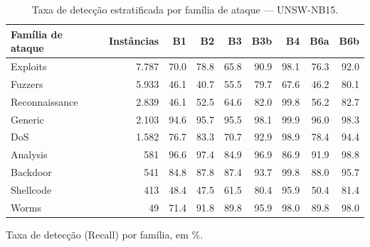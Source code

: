 \begin{table}[htbp]
\centering
\caption{Taxa de detecção estratificada por família de ataque — UNSW-NB15.}
\label{tab:recall-estratificado-unsw-nb15}
\small
\begin{tabular}{lrrrrrrrr}
\hline
Família de ataque & Instâncias & B1 & B2 & B3 & B3b & B4 & B6a & B6b \\
\hline
Exploits & 7.787 & 70.0 & 78.8 & 65.8 & 90.9 & 98.1 & 76.3 & 92.0 \\
Fuzzers & 5.933 & 46.1 & 40.7 & 55.5 & 79.7 & 67.6 & 46.2 & 80.1 \\
Reconnaissance & 2.839 & 46.1 & 52.5 & 64.6 & 82.0 & 99.8 & 56.2 & 82.7 \\
Generic & 2.103 & 94.6 & 95.7 & 95.5 & 98.1 & 99.9 & 96.0 & 98.3 \\
DoS & 1.582 & 76.7 & 83.3 & 70.7 & 92.9 & 98.9 & 78.4 & 94.4 \\
Analysis & 581 & 96.6 & 97.4 & 84.9 & 96.9 & 86.9 & 91.9 & 98.8 \\
Backdoor & 541 & 84.8 & 87.8 & 87.4 & 93.7 & 99.8 & 88.0 & 95.7 \\
Shellcode & 413 & 48.4 & 47.5 & 61.5 & 80.4 & 95.9 & 50.4 & 81.4 \\
Worms & 49 & 71.4 & 91.8 & 89.8 & 95.9 & 98.0 & 89.8 & 98.0 \\
\hline
\end{tabular}
\begin{flushleft}\footnotesize Taxa de detecção (Recall) por família, em \%. \end{flushleft}
\end{table}
